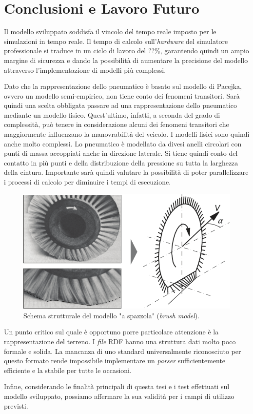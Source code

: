 \chapter{Conclusioni e Lavoro Futuro}
\label{Conclusione}
%
Il modello sviluppato soddisfa il vincolo del tempo reale imposto per le simulazioni in tempo reale. Il tempo di calcolo sull'\textit{hardware} del simulatore professionale si traduce in un ciclo di lavoro del ??\%, garantendo quindi un ampio margine di sicurezza e dando la possibilità di aumentare la precisione del modello attraverso l'implementazione di modelli più complessi.

Dato che la rappresentazione dello pneumatico è basato sul modello di Pacejka, ovvero un modello semi-empirico, non tiene conto dei fenomeni transitori. Sarà quindi una scelta obbligata passare ad una rappresentazione dello pneumatico mediante un modello fisico. Quest'ultimo, infatti, a seconda del grado di complessità, può tenere in considerazione alcuni dei fenomeni transitori che maggiormente influenzano la manovrabilità del veicolo. I modelli fisici sono quindi anche molto complessi. Lo pneumatico è modellato da divesi anelli circolari con punti di massa accoppiati anche in direzione laterale. Si tiene quindi conto del contatto in più punti e della distribuzione della pressione su tutta la larghezza della cintura. Importante sarà quindi valutare la possibilità di poter parallelizzare i processi di calcolo per diminuire i tempi di esecuzione.

\begin{figure}
	\centering
	\includegraphics[width=0.7\linewidth]{Figures/brush_model}
	\caption{Schema strutturale del modello "a spazzola" (\textit{brush model}). }
	\label{brushmodel}
\end{figure}

Un punto critico sul quale è opportuno porre particolare attenzione è la rappresentazione del terreno. I \textit{file} \ac{RDF} hanno una struttura dati molto poco formale e solida. La mancanza di uno standard universalmente riconosciuto per questo formato rende impossibile implementare un \textit{parser} sufficientemente efficiente e la stabile per tutte le occasioni.

Infine, considerando le finalità principali di questa tesi e i test effettuati sul modello sviluppato, possiamo affermare la sua validità per i campi di utilizzo previsti.